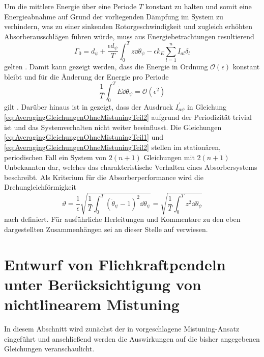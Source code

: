 Um die mittlere Energie über eine Periode $T$ konstant zu halten und somit eine Energieabnahme auf Grund der vorliegenden Dämpfung im System zu verhindern, was zu einer sinkenden Rotorgeschwindigkeit und zugleich erhöhten Absorberausschlägen führen würde, muss aus Energiebetrachtungen resultierend
\begin{equation}
	\Gamma_0 = d_{\psi} + \frac{\epsilon d_{\psi}}{T} \int_0^T{z \dd \theta_{\psi}} - \epsilon k_E \sum_{l=1}^n I_{al} \delta_l
	\label{eq:WahlVonW0NachEnergiebetrachtungen}
\end{equation}
gelten  \cite{Mayet:Tautochronic}. Damit kann gezeigt werden, 
dass die Energie in  Ordnung $\mathcal{O}(\epsilon)$ konstant bleibt und für die Änderung der Energie pro Periode 
\begin{equation}
	\frac{1}{T} \int_0^T   \dot{E} \dd \theta_{\psi} = \mathcal{O}(\epsilon^2)
	\label{eq:AenderungderEnergievonO2}
\end{equation}
gilt  \cite{Mayet:Tautochronic}. 
%
Darüber hinaus ist in \cite{Mayet:Tautochronic}  gezeigt, dass der Ausdruck $I_{a \psi}^\prime$ 
in Gleichung 	\eqref{eq:AveragingGleichungenOhneMistuningTeil2} aufgrund der Periodizität trivial ist und das Systemverhalten nicht weiter beeinflusst.  
Die Gleichungen \eqref{eq:AveragingGleichungenOhneMistuningTeil1} und  \eqref{eq:AveragingGleichungenOhneMistuningTeil2} 	
stellen im stationären, periodischen Fall ein System von $2(n+1)$ Gleichungen mit $2(n+1)$ Unbekannten dar, 
welches das charakteristische Verhalten eines Absorbersystems beschreibt.  
Als Kriterium für die  Absorberperformance wird die Drehungleichförmigkeit
%
%
%
\begin{equation}
	\vartheta = \frac{1}{\epsilon} \sqrt{\frac{1}{T} \int_0^T{ \left( \dot{\theta}_{\psi} - 1 \right)^2 \dd \theta_{\psi}}} = \sqrt{\frac{1}{T} \int_0^T{z^2 \dd \theta_{\psi}}}
	\label{eq:DegreeOfIrregularity}
\end{equation}
nach \cite{Mayet:Tautochronic} definiert. 
Für ausführliche Herleitungen und Kommentare zu den eben dargestellten Zusammenhängen 
sei an dieser Stelle auf \cite{Mayet:Tautochronic} verwiesen.
%
%
%
%
%

\section[Entwurf von Fliehkraftpendeln mit nichtlinearem Mistuning]{Entwurf von Fliehkraftpendeln unter Berücksichtigung von nichtlinearem Mistuning} \label{sec:TheorieMistuning}
%
%
In diesem Abschnitt wird zunächst der in \cite{Mayet:CPVAMitMistuning} vorgeschlagene
Mistuning-Ansatz eingeführt und anschließend werden die Auswirkungen auf die bisher
angegebenen Gleichungen veranschaulicht.



